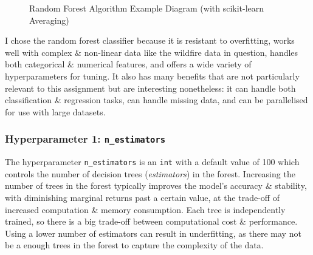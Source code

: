\documentclass[a4paper]{article}
\begin{document}
\begin{figure}[H]
\centering
{}
\caption{Random Forest Algorithm Example Diagram (with scikit-learn Averaging)}
\end{figure}

I chose the random forest classifier because it is resistant to overfitting, works well with complex \& non-linear data like the wildfire data in question, handles both categorical \& numerical features, and offers a wide variety of hyperparameters for tuning.
It also has many benefits that are not particularly relevant to this assignment but are interesting nonetheless: it can handle both classification \& regression tasks, can handle missing data, and can be parallelised for use with large datasets.

\subsubsection{Hyperparameter 1: \texttt{n_estimators}}
The hyperparameter \texttt{n_estimators} is an \texttt{int} with a default value of 100 which controls the number of decision trees (\textit{estimators}) in the forest\supercite{scikit_randomforestclassifier}.
Increasing the number of trees in the forest typically improves the model's accuracy \& stability, with diminishing marginal returns past a certain value, at the trade-off of increased computation \& memory consumption.
Each tree is independently trained, so there is a big trade-off between computational cost \& performance.
Using a lower number of estimators can result in underfitting, as there may not be a enough trees in the forest to capture the complexity of the data.
\end{document}
